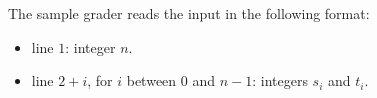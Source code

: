The sample grader reads the input in the following format:

\begin{itemize}
\item line $1$: integer $n$.
\item line $2 + i$, for $i$ between $0$ and $n - 1$: integers $s_i$ and $t_i$.
\end{itemize}